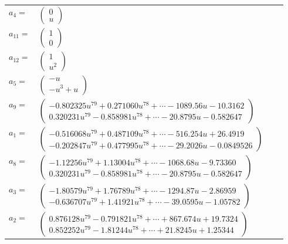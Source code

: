 \documentclass[1p]{elsarticle_modified}
\theoremstyle{definition}
\begin{document}
\begin{tabular}{m{7pt} m{180pt} m{7pt} m{180pt} }
\flushright $a_{4}=$&$\begin{pmatrix}0\\u\end{pmatrix}$ \\
\flushright $a_{11}=$&$\begin{pmatrix}1\\0\end{pmatrix}$ \\
\flushright $a_{12}=$&$\begin{pmatrix}1\\u^2\end{pmatrix}$ \\
\flushright $a_{5}=$&$\begin{pmatrix}- u\\- u^3+u\end{pmatrix}$ \\
\flushright $a_{9}=$&$\begin{pmatrix}-0.802325 u^{79}+0.271060 u^{78}+\cdots-1089.56 u-10.3162\\0.320231 u^{79}-0.858981 u^{78}+\cdots-20.8795 u-0.582647\end{pmatrix}$ \\
\flushright $a_{1}=$&$\begin{pmatrix}-0.516068 u^{79}+0.487109 u^{78}+\cdots-516.254 u+26.4919\\-0.202847 u^{79}+0.477995 u^{78}+\cdots-29.2026 u-0.0849526\end{pmatrix}$ \\
\flushright $a_{8}=$&$\begin{pmatrix}-1.12256 u^{79}+1.13004 u^{78}+\cdots-1068.68 u-9.73360\\0.320231 u^{79}-0.858981 u^{78}+\cdots-20.8795 u-0.582647\end{pmatrix}$ \\
\flushright $a_{3}=$&$\begin{pmatrix}-1.80579 u^{79}+1.76789 u^{78}+\cdots-1294.87 u-2.86959\\-0.636707 u^{79}+1.41921 u^{78}+\cdots-39.0595 u-1.05782\end{pmatrix}$ \\
\flushright $a_{2}=$&$\begin{pmatrix}0.876128 u^{79}-0.791821 u^{78}+\cdots+867.674 u+19.7324\\0.852252 u^{79}-1.81244 u^{78}+\cdots+21.8245 u+1.25344\end{pmatrix}$ \\

\end{tabular}
\end{document}
